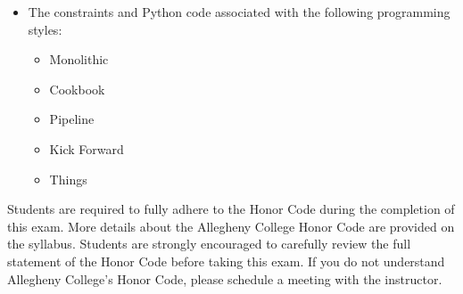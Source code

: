 \documentclass[11pt]{article}
\begin{document}
\begin{itemize}
\begin{itemize}
      \item The constraints and Python code associated with the following
        programming styles:

        \begin{itemize}
          \itemsep 0.025in
          \item Monolithic
          \item Cookbook
          \item Pipeline
          \item Kick Forward
          \item Things
        \end{itemize}

    \end{itemize}

\end{itemize}


\vspace*{-.025in}

\noindent Students are required to fully adhere to the Honor Code during the
completion of this exam. More details about the Allegheny College Honor Code are
provided on the syllabus. Students are strongly encouraged to carefully review
the full statement of the Honor Code before taking this exam. If you do not
understand Allegheny College's Honor Code, please schedule a meeting with the
instructor.



\end{document}
